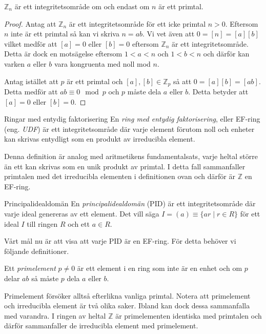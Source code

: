 \documentclass{article}
\theoremstyle{definition}
\begin{document}
\begin{mytheo}{}{}
  $\mathbb{Z}_n$ är ett integritetsområde om och endast om $n$ är ett primtal.
\end{mytheo}
\begin{proof}
  Antag att $\mathbb{Z}_n$ är ett integritetsområde för ett icke primtal $n > 0$. Eftersom $n$ inte är ett primtal så kan vi skriva 
  $n = ab$. Vi vet även att $0 = [n] = [a][b]$ vilket medför att $[a] = 0$ eller $[b] = 0$ eftersom $\mathbb{Z}_n$ är ett integritetsområde. 
  Detta är dock en motsägelse eftersom $1 < a < n$ och $1 < b < n$ och därför kan varken $a$ eller $b$ vara kongruenta med noll mod $n$. 

  Antag istället att $p$ är ett primtal och $[a], [b] \in \mathbb{Z}_p$ så att $0 = [a][b] = [ab]$. Detta medför att 
  $ab \equiv 0 \mod p$ och $p$ måste dela $a$ eller $b$. Detta betyder att $[a] = 0$ eller $[b] = 0$.
\end{proof}

\begin{mydef}{Ringar med entydig faktorisering}{}
  En \textit{ring med entydig faktorisering}, eller EF-ring (eng. \textit{UDF}) är ett integritetsområde där varje element förutom noll och enheter
  kan skrivas entydligt som en produkt av irreducibla element.
\end{mydef}

Denna definition är analog med aritmetikens fundamentalsats, varje heltal större än ett kan skrivas som en unik produkt av primtal. I detta fall sammanfaller 
primtalen med det irreducibla elementen i definitionen ovan och därför är $\mathbb{Z}$ en EF-ring.

\begin{mydef}{Principalidealdomän}{}
  En \textit{principalidealdomän} (PID) är ett integritetsområde där varje ideal genereras av ett element. 
  Det vill säga $I = (a) \equiv \{ar \; | \; r \in R\}$ för ett ideal $I$ till ringen $R$ och ett $a \in R$.
\end{mydef}

Vårt mål nu är att visa att varje PID är en EF-ring. För detta behöver vi följande definitioner. 

\begin{mydef}{}{}
  Ett \textit{primelement} $p \neq 0$ är ett element i en ring som inte är en enhet och om $p$ delar $ab$ så måste $p$ dela $a$ eller $b$.
\end{mydef}

Primelement försöker alltså efterlikna vanliga primtal. Notera att primelement och irreducibla element är två olika saker. Ibland kan dock dessa 
sammanfalla med varandra. 
I ringen av heltal $\mathbb{Z}$ är primelementen identiska med primtalen och därför sammanfaller 
de irreducibla element med primelement. 
\end{document}
